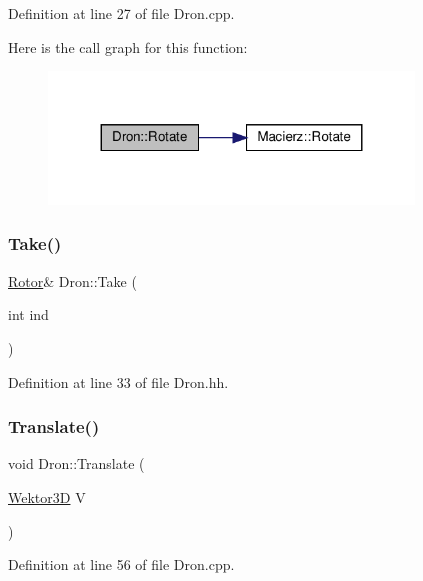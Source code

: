 Definition at line 27 of file Dron.\+cpp.

Here is the call graph for this function\+:
\nopagebreak
\begin{figure}[H]
\begin{center}
\leavevmode
\includegraphics[width=275pt]{class_dron_ae59a8da00fb889c8f97ae08b21a184f9_cgraph}
\end{center}
\end{figure}
\mbox{\label{class_dron_a7e22e894b00020b62884cfce45850336}} 
\subsubsection{\texorpdfstring{Take()}{Take()}}
{\footnotesize\ttfamily \hyperlink{class_rotor}{Rotor}\& Dron\+::\+Take (\begin{DoxyParamCaption}\item[{int}]{ind }\end{DoxyParamCaption})\hspace{0.3cm}{\ttfamily [inline]}}



Definition at line 33 of file Dron.\+hh.

\mbox{\label{class_dron_ac9b37f92a345cce27dbc7c16cd40ce27}} 
\subsubsection{\texorpdfstring{Translate()}{Translate()}}
{\footnotesize\ttfamily void Dron\+::\+Translate (\begin{DoxyParamCaption}\item[{\hyperlink{_wektor3_d_8hh_ac353a272b38b4ad342f7181ad7bdb91a}{Wektor3D}}]{V }\end{DoxyParamCaption})}



Definition at line 56 of file Dron.\+cpp.



